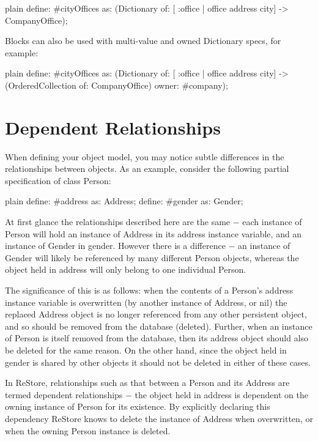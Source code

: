 \documentclass[10pt,twoside,english]{_support/latex/sbabook/sbabook}
\begin{document}
\begin{displaycode}{plain}
define: #cityOffices as: (Dictionary of: [ :office | office address city] -> CompanyOffice);
\end{displaycode}

Blocks can also be used with multi-value and owned Dictionary specs, for example:

\begin{displaycode}{plain}
define: #cityOffices as: 
	(Dictionary 
of: [ :office | office address city] -> (OrderedCollection of: CompanyOffice) 
owner: #company);
\end{displaycode}
\section{Dependent Relationships}
When defining your object model, you may notice subtle differences in the relationships between objects. As an example, consider the following partial specification of class Person: 

\begin{displaycode}{plain}
	define: #address as: Address;
	define: #gender as: Gender;
\end{displaycode}

	
At first glance the relationships described here are the same − each instance of Person will hold an instance of Address in its address instance variable, and an instance of Gender in gender. However there is a difference − an instance of Gender will likely be referenced by many different Person objects, whereas the object held in address will only belong to one individual Person. 

The significance of this is as follows: when the contents of a Person's address instance variable is overwritten (by another instance of Address, or nil) the replaced Address object is no longer referenced from any other persistent object, and so should be removed from the database (deleted). Further, when an instance of Person is itself removed from the database, then its address object should also be deleted for the same reason. On the other hand, since the object held in gender is shared by other objects it should not be deleted in either of these cases. 

In ReStore, relationships such as that between a Person and its Address are termed dependent relationships − the object held in address is dependent on the owning instance of Person for its existence. By explicitly declaring this dependency ReStore knows to delete the instance of Address when overwritten, or when the owning Person instance is deleted. 
\end{document}
